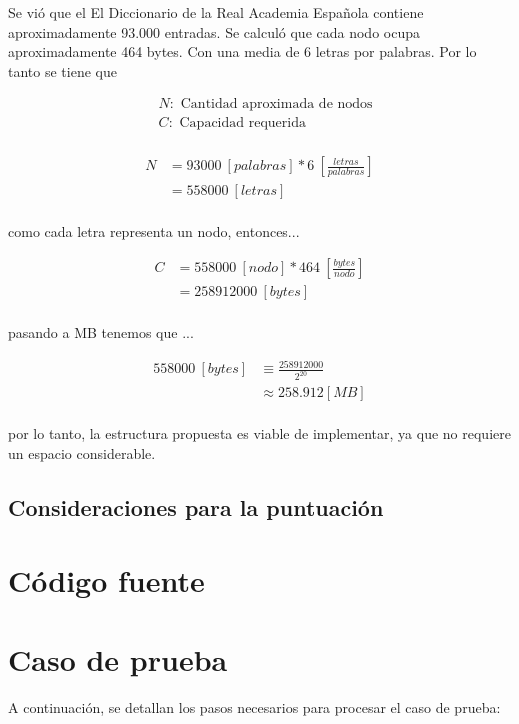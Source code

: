 \documentclass[twocolumn, fontsize=10pt]{article}
\begin{document}
Se vió que el El Diccionario de la Real Academia Española contiene aproximadamente 93.000 entradas. Se calculó que cada nodo ocupa aproximadamente 464 bytes. Con una media de 6 letras por palabras. Por lo tanto se tiene que

\[
\begin{aligned}
& N: \text{ Cantidad aproximada de nodos} \\
& C: \text{ Capacidad requerida}\\
&
\end{aligned}
\]

\[
\begin{aligned}
N & = 93000 \: \left[palabras\right] * 6 \: \left[\frac{letras}{palabras}\right]\\
& = 558000 \: \left[letras\right]\\
&
\end{aligned}
\]

como cada letra representa un nodo, entonces...

\[
\begin{aligned}
C & = 558000 \: \left[nodo\right] * 464 \: \left[\frac{bytes}{nodo}\right]\\
& = 258912000 \: \left[bytes\right]\\
&
\end{aligned}
\]

pasando a MB tenemos que ...

\[
\begin{aligned}
558000 \: \left[bytes\right] & \equiv \frac{258912000}{2^{20}}\\
& \approx \num{258.912} \left[MB\right]\\
&
\end{aligned}
\]

por lo tanto, la estructura propuesta es viable de implementar, ya que no requiere un espacio considerable.

\subsection{Consideraciones para la puntuación}

\section{Código fuente}

\section{Caso de prueba}
A continuación, se detallan los pasos necesarios para procesar el caso de prueba:
\end{document}
